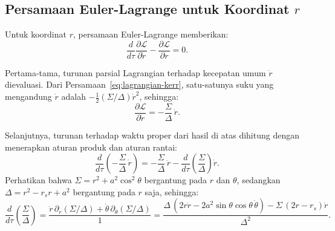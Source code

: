 \subsection{Persamaan Euler-Lagrange untuk Koordinat $r$}
\label{subsec:euler-lagrange-r}

Untuk koordinat $r$, persamaan Euler-Lagrange memberikan:
\begin{equation}
    \frac{d}{d\tau}\frac{\partial\mathcal{L}}{\partial\dot{r}}
    - \frac{\partial\mathcal{L}}{\partial r} = 0.
    \label{eq:el-r}
\end{equation}

Pertama-tama, turunan parsial Lagrangian terhadap kecepatan umum $\dot{r}$ dievaluasi.
Dari Persamaan~\eqref{eq:lagrangian-kerr},
satu-satunya suku yang mengandung $\dot{r}$ adalah
$-\tfrac{1}{2}(\Sigma/\Delta)\dot{r}^2$, sehingga:
\begin{equation}
    \frac{\partial\mathcal{L}}{\partial\dot{r}}
    = -\frac{\Sigma}{\Delta}\,\dot{r}.
    \label{eq:dLdrdot}
\end{equation}

Selanjutnya, turunan terhadap waktu proper dari hasil di atas
dihitung dengan menerapkan aturan produk dan aturan rantai:
\begin{equation}
    \frac{d}{d\tau}\!\left(-\frac{\Sigma}{\Delta}\,\dot{r}\right)
    = -\frac{\Sigma}{\Delta}\,\ddot{r}
      - \frac{d}{d\tau}\!\left(\frac{\Sigma}{\Delta}\right)\dot{r}.
    \label{eq:ddtau-dLdrdot}
\end{equation}
Perhatikan bahwa $\Sigma = r^2 + a^2\cos^2\!\theta$ bergantung pada $r$ dan $\theta$,
sedangkan $\Delta = r^2 - r_s r + a^2$ bergantung pada $r$ saja, sehingga:
\begin{equation}
    \frac{d}{d\tau}\!\left(\frac{\Sigma}{\Delta}\right)
    = \frac{\dot{r}\,\partial_r(\Sigma/\Delta)
          + \dot{\theta}\,\partial_\theta(\Sigma/\Delta)}{1}
    = \frac{\Delta\,(2r\dot{r} - 2a^2\sin\theta\cos\theta\,\dot{\theta})
          - \Sigma\,(2r - r_s)\dot{r}}{\Delta^2}.
    \label{eq:ddt-sigma-delta}
\end{equation}

